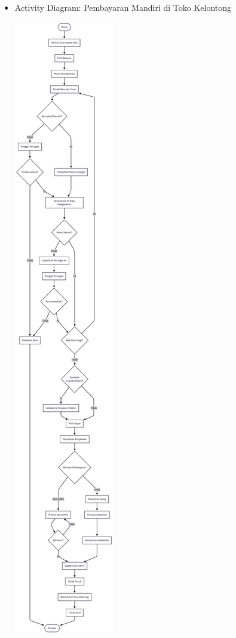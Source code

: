 \documentclass[a4paper]{article}
\begin{document}
\begin{enumerate}[itemsep=1em]
  \begin{itemize}[itemsep=1em]
    \item Activity Diagram: Pembayaran Mandiri di Toko Kelontong
    \begin{center}
      \includegraphics[height=0.9\textheight,keepaspectratio]{self-checkout-activity-diagram.png}
    \end{center}
  \end{itemize}


\end{enumerate}
\end{document}

